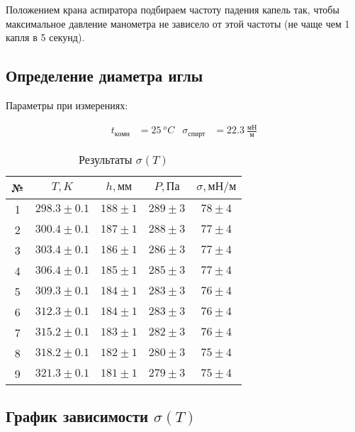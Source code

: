 \documentclass[a4paper, 12pt]{article}
\begin{document}
			Положением крана аспиратора подбираем частоту падения капель так, чтобы максимальное давление манометра не зависело от этой частоты (не чаще чем 1 капля в 5 секунд).

		\subsection{Определение диаметра иглы}
			\label{needle_diam}

			Параметры при измерениях:

			\begin{align*}
				t_{комн} &= 25~^oC & \sigma_{спирт} &= 22.3~\frac{мН}{м}
			\end{align*}


			\begin{table}[!ht]
				\centering
				\begin{tabular}{|c|c|c|c|c|}
					\hline

					№ & $T, K$ & $h, мм$ & $P, Па$ & $\sigma, мН/м$\\ \hline
					1 & $298.3 \pm 0.1$ & $188 \pm 1$ & $289 \pm 3$ & $78 \pm 4$\\ \hline
					2 & $300.4 \pm 0.1$ & $187 \pm 1$ & $288 \pm 3$ & $77 \pm 4$\\ \hline
					3 & $303.4 \pm 0.1$ & $186 \pm 1$ & $286 \pm 3$ & $77 \pm 4$\\ \hline
					4 & $306.4 \pm 0.1$ & $185 \pm 1$ & $285 \pm 3$ & $77 \pm 4$\\ \hline
					5 & $309.3 \pm 0.1$ & $184 \pm 1$ & $283 \pm 3$ & $76 \pm 4$\\ \hline
					6 & $312.3 \pm 0.1$ & $184 \pm 1$ & $283 \pm 3$ & $76 \pm 4$\\ \hline
					7 & $315.2 \pm 0.1$ & $183 \pm 1$ & $282 \pm 3$ & $76 \pm 4$\\ \hline
					8 & $318.2 \pm 0.1$ & $182 \pm 1$ & $280 \pm 3$ & $75 \pm 4$\\ \hline
					9 & $321.3 \pm 0.1$ & $181 \pm 1$ & $279 \pm 3$ & $75 \pm 4$\\ \hline

				\end{tabular}
				\caption{Результаты $\sigma(T)$}
				\label{tab:sigma_T}
			\end{table}

		\subsection{График зависимости $\sigma(T)$}
\end{document}
